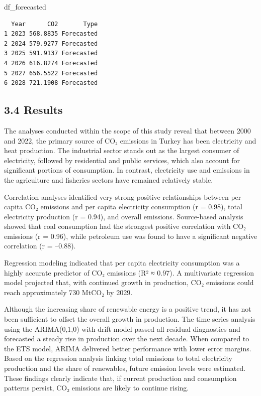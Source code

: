 \documentclass[
  letterpaper,
  DIV=11,
  numbers=noendperiod]{scrartcl}
\newenvironment{Shaded}{\begin{snugshade}}{\end{snugshade}}
\newcommand{\NormalTok}[1]{\textcolor[rgb]{0.00,0.23,0.31}{#1}}
\begin{document}
\begin{Shaded}
\begin{Highlighting}[]
\NormalTok{df\_forecasted}
\end{Highlighting}
\end{Shaded}

\begin{verbatim}
  Year      CO2       Type
1 2023 568.8835 Forecasted
2 2024 579.9277 Forecasted
3 2025 591.9137 Forecasted
4 2026 616.8274 Forecasted
5 2027 656.5522 Forecasted
6 2028 721.1908 Forecasted
\end{verbatim}

\subsection{3.4 Results}\label{results}

The analyses conducted within the scope of this study reveal that
between 2000 and 2022, the primary source of CO₂ emissions in Turkey has
been electricity and heat production. The industrial sector stands out
as the largest consumer of electricity, followed by residential and
public services, which also account for significant portions of
consumption. In contrast, electricity use and emissions in the
agriculture and fisheries sectors have remained relatively stable.

Correlation analyses identified very strong positive relationships
between per capita CO₂ emissions and per capita electricity consumption
(r = 0.98), total electricity production (r = 0.94), and overall
emissions. Source-based analysis showed that coal consumption had the
strongest positive correlation with CO₂ emissions (r = 0.96), while
petroleum use was found to have a significant negative correlation (r =
--0.88).

Regression modeling indicated that per capita electricity consumption
was a highly accurate predictor of CO₂ emissions (R² ≈ 0.97). A
multivariate regression model projected that, with continued growth in
production, CO₂ emissions could reach approximately 730 MtCO₂ by 2029.

Although the increasing share of renewable energy is a positive trend,
it has not been sufficient to offset the overall growth in production.
The time series analysis using the ARIMA(0,1,0) with drift model passed
all residual diagnostics and forecasted a steady rise in production over
the next decade. When compared to the ETS model, ARIMA delivered better
performance with lower error margins. Based on the regression analysis
linking total emissions to total electricity production and the share of
renewables, future emission levels were estimated. These findings
clearly indicate that, if current production and consumption patterns
persist, CO₂ emissions are likely to continue rising.
\end{document}
